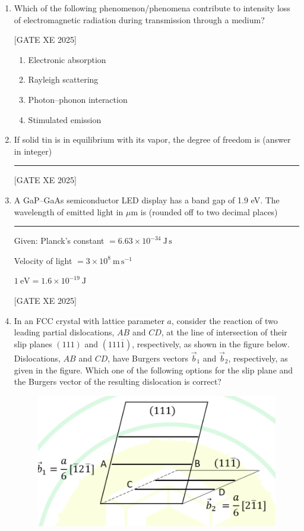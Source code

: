 \documentclass[journal,12pt,onecolumn]{IEEEtran}
\theoremstyle{remark}
\begin{document}
\begin{enumerate}
\item Which of the following phenomenon/phenomena contribute to intensity loss of electromagnetic radiation during transmission through a medium?

\hfill[GATE XE 2025]

\begin{multicols}{2}
\begin{enumerate}
\item Electronic absorption
\item Rayleigh scattering
\item Photon–phonon interaction
\item Stimulated emission
\end{enumerate}
\end{multicols}

\item If solid tin is in equilibrium with its vapor, the degree of freedom is (answer in integer) \rule{3cm}{0.15mm}

\hfill[GATE XE 2025]

\item A GaP–GaAs semiconductor LED display has a band gap of 1.9 eV. The wavelength of emitted light in $\mu$m is (rounded off to two decimal places) \rule{3cm}{0.15mm}

Given: Planck’s constant $=6.63\times 10^{-34}\ \mathrm{J\,s}$

Velocity of light $=3\times 10^{8}\ \mathrm{m\,s^{-1}}$

$1\ \mathrm{eV}=1.6\times 10^{-19}\ \mathrm{J}$

\hfill[GATE XE 2025]
\item In an FCC crystal with lattice parameter $a$, consider the reaction of two leading partial dislocations, $AB$ and $CD$, at the line of intersection of their slip planes $(111)$ and $(111\overline{1})$, respectively, as shown in the figure below. Dislocations, $AB$ and $CD$, have Burgers vectors $\vec{b}_1$ and $\vec{b}_2$, respectively, as given in the figure. Which one of the following options for the slip plane and the Burgers vector of the resulting dislocation is correct?

\begin{figure}[H]
    \centering
    \includegraphics[width=0.5\columnwidth]{figs/fig11.png}
    \caption{}
    \label{fig:placeholder}
\end{figure}



\end{enumerate}
\end{document}
